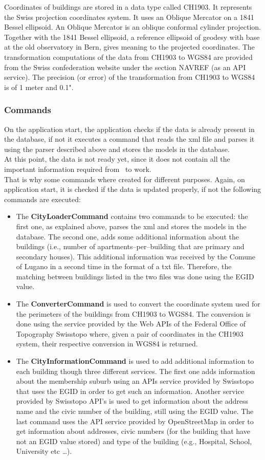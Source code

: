 Coordinates of buildings are stored in a data type called CH1903. It represents the Swiss projection coordinates system. It uses an Oblique Mercator on a 1841 Bessel ellipsoid. An Oblique Mercator is an oblique conformal cylinder projection. Together with the 1841 Bessel ellipsoid, a reference ellipsoid of geodesy with base at the old observatory in Bern, gives meaning to the projected coordinates. The transformation computations of the data from CH1903 to WGS84 are provided from the Swiss confederation website under the section NAVREF (as an API service). The precision (or error) of the transformation from CH1903 to WGS84 is of 1 meter and 0.1".\subsubsection{Commands}
On the application start, the application checks if the data is already present in the database, if not it executes a command that reads the xml file and parses it using the parser described above and stores the models in the database.\\  
At this point, the data is not ready yet, since it does not contain all the important information required from \applicationName\ to work.\\
That is why some commands where created for different purposes. Again, on application start, it is checked if the data is updated properly, if not the following commands are executed:
\begin{itemize}
	\item The {\bf CityLoaderCommand} contains two commands to be executed: the first one, as explained above, parses the xml and stores the models in the database. The second one, adds some additional information about the buildings (i.e., number of apartments--per--building that are primary and secondary houses). This additional information was received by the Comune of Lugano in a second time in the format of a txt file. Therefore, the matching between buildings listed in the two files was done using the EGID value. 
	\item The {\bf ConverterCommand} is used to convert the coordinate system used for the perimeters of the buildings from CH1903 to WGS84. The conversion is done using the service provided by the Web APIs of the Federal Office of Topography Swisstopo  where, given a pair of coordinates in the CH1903 system, their respective conversion in WGS84 is returned.
	\item The {\bf CityInformationCommand} is used to add additional information to each building though three different services. The first one adds information about the membership suburb using an APIs service provided by Swisstopo that uses the EGID in order to get such an information. Another service provided by Swisstopo API's is used to get information about the address name and the civic number of the building, still using the EGID value. The last command uses the API service provided by OpenStreetMap in order to get information about addresses, civic numbers (for the building that have not an EGID value stored) and type of the building (e.g., Hospital, School, University etc \dots).  
\end{itemize}
